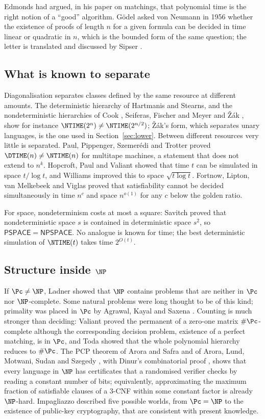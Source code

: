 Edmonds \cite{Edm65} had argued, in his paper on matchings, that polynomial time
is the right notion of a ``good'' algorithm. G\"odel asked von Neumann in 1956 whether
the existence of proofs of length $n$ for a given formula can be decided in time
linear or quadratic in $n$, which is the bounded form of the same question; the
letter is translated and discussed by Sipser \cite{Sip92}.

\subsection{What is known to separate}
Diagonalisation separates classes defined by the same resource at different
amounts. The deterministic hierarchy of Hartmanis and Stearns, and the
nondeterministic hierarchies of Cook \cite{Coo73}, Seiferas, Fischer and Meyer
\cite{SFM78} and \v{Z}\'ak \cite{Zak83}, show for instance
$\NTIME(2^n)\ne\NTIME(2^{n/2})$; \v{Z}\'ak's form, which separates unary
languages, is the one used in Section~\ref{sec:lower}. Between different
resources very little is separated. Paul, Pippenger, Szemer\'edi and Trotter
\cite{PPST83} proved $\DTIME(n)\ne\NTIME(n)$ for multitape machines, a statement
that does not extend to $n^k$. Hopcroft, Paul and Valiant \cite{HPV77} showed
that time $t$ can be simulated in space $t/\log t$, and Williams \cite{Wil25}
improved this to space $\sqrt{t\log t}$. Fortnow, Lipton, van Melkebeek and
Viglas \cite{FLMV05} proved that satisfiability cannot be decided
simultaneously in time $n^c$ and space $n^{o(1)}$ for any $c$ below the golden
ratio.

For space, nondeterminism costs at most a square: Savitch \cite{Sav70} proved
that nondeterministic space $s$ is contained in deterministic space $s^2$, so
$\mathsf{PSPACE}=\mathsf{NPSPACE}$. No analogue is known for time; the best
deterministic simulation of $\NTIME(t)$ takes time $2^{O(t)}$.

\subsection{Structure inside $\NP$}
If $\Pc\ne\NP$, Ladner \cite{Lad75} showed that $\NP$ contains problems that are
neither in $\Pc$ nor $\NP$-complete. Some natural problems were long thought to
be of this kind; primality was placed in $\Pc$ by Agrawal, Kayal and Saxena
\cite{AKS04}. Counting is much stronger than deciding: Valiant \cite{Val79b}
proved the permanent of a zero-one matrix $\#\Pc$-complete although the
corresponding decision problem, existence of a perfect matching, is in $\Pc$,
and Toda \cite{Tod91} showed that the whole polynomial hierarchy reduces to
$\#\Pc$. The PCP theorem of Arora and Safra \cite{AS98} and of Arora, Lund,
Motwani, Sudan and Szegedy \cite{ALMSS98}, with Dinur's combinatorial proof
\cite{Din07}, shows that every language in $\NP$ has certificates that a
randomised verifier checks by reading a constant number of bits; equivalently,
approximating the maximum fraction of satisfiable clauses of a $3$-CNF within
some constant factor is already $\NP$-hard. Impagliazzo \cite{Imp95} described
five possible worlds, from $\Pc=\NP$ to the existence of public-key
cryptography, that are consistent with present knowledge.

